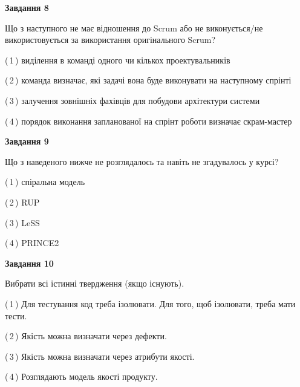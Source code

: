 \documentclass[10pt, ukrainian]{article}
\begin{document}
{\begin {large}
{\begin {center}\textbf{Завдання 8}\end {center}}\par
Що з наступного не має відношення до Scrum або не виконується/не використовується за використання оригінального Scrum?\par
\vspace{2mm}



(\,1\,) виділення в команді одного чи кількох проектувальників%



(\,2\,) команда визначає, які задачі вона буде виконувати на наступному спрінті%



(\,3\,) залучення зовнішніх фахівців для побудови архітектури системи%



(\,4\,) порядок виконання запланованої на спрінт роботи визначає скрам-мастер%


{\begin {center}\textbf{Завдання 9}\end {center}}\par
Що з наведеного нижче не розглядалось та навіть не згадувалось у курсі?\par
\vspace{2mm}



(\,1\,) спіральна модель%



(\,2\,) RUP%



(\,3\,) LeSS%



(\,4\,) PRINCE2%


{\begin {center}\textbf{Завдання 10}\end {center}}\par
Вибрати всі істинні твердження (якщо існують).\par
\vspace{2mm}



(\,1\,) Для тестування код треба ізолювати. Для того, щоб ізолювати, треба мати тести.%



(\,2\,) Якість можна визначати через дефекти.%



(\,3\,) Якість можна визначати через атрибути якості.%



(\,4\,) Розглядають модель якості продукту.%



\end {large}}
\end{document}
